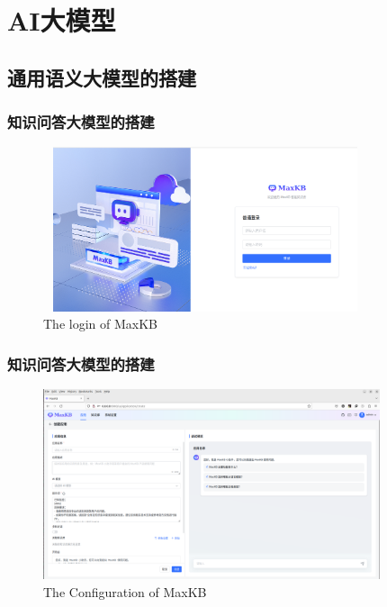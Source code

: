 \section{\rm{AI}大模型}
\subsection{通用语义大模型的搭建}
\begin{frame}
	\frametitle{知识问答大模型的搭建}
\begin{figure}[h!]
\centering
\vskip -8pt
\includegraphics[height=1.90in,width=3.75in,viewport=0 0 1409 750,clip]{Figures/MaxKB_login.png}
\caption{\tiny\textrm{The login of MaxKB}}%
\label{Fig:MaxKB_login}
\end{figure}
{\fontsize{7.5pt}{6.0pt}}
\end{frame}

\begin{frame}
	\frametitle{知识问答大模型的搭建}
\begin{figure}[h!]
\centering
\vskip -8pt
\includegraphics[height=2.2in,width=3.90in,viewport=3 0 1848 1041,clip]{Figures/MaxKB_Creat-APP.png}
\caption{\tiny\textrm{The Configuration of MaxKB}}%
\label{Fig:MaxKB_Creat-APP}
\end{figure}
\end{frame}

